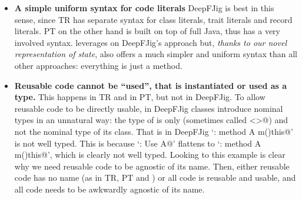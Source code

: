 \begin{itemize}
\item {\bf A simple uniform syntax for code literals}
DeepFJig is best in this sense, since TR has separate syntax for class literals, trait literals and record literals.
PT on the other hand is built on top of full Java, thus has a very
involved syntax.
\name leverages on DeepFJig's approach but,
\emph{thanks to our novel representation of state}, \name also offers a much simpler and uniform syntax than
all other approaches: everything is just a method.
\item 
{\bf Reusable code cannot be ``used'', that is instantiated or used as a type.}
This happens in TR and in PT, but not in DeepFJig. To allow reusable code to be directly 
usable, in DeepFJig
classes introduce nominal types in an unnatural way: the type of
\Q@this@ is only \Q@This@ (sometimes called \Q@<>@) and not the
nominal type of its class. 
That is in DeepFJig 
`\Q@A:{ method A m()this}@' is not well typed. This is because
`\Q@B: Use A@' flattens to `\Q@B:{ method A m()this}@', which is clearly not well typed.
Looking to this example is clear why we need reusable code to be agnostic of its name.
Then, either reusable code has no name (as in TR, PT and \name)
or all code is reusable and usable, and all code needs to be awkwardly agnostic of its name.


\end{itemize}
